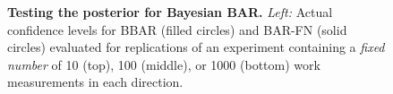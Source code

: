 \documentclass[aps,pre,twocolumn,superscriptaddress,nofootinbib]{revtex4}
\begin{document}
\begin{figure}[htb]
  \begin{center}
  \end{center}
  \caption{{\bf Testing the posterior for Bayesian BAR.}
  \emph{Left:} Actual confidence levels for BBAR (filled circles) and BAR-FN (solid circles) evaluated for replications of an experiment containing a \emph{fixed number} of 10 (top), 100 (middle), or 1000 (bottom) work measurements in each direction. 
}
\end{figure}
\end{document}
